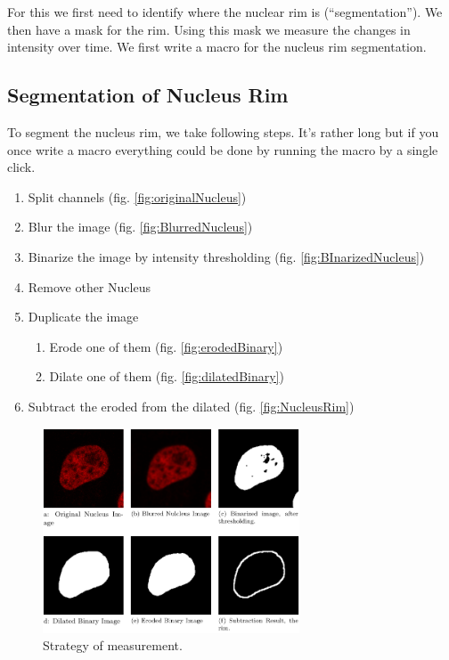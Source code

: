 \documentclass[11pt,a4paper,oneside]{report}
\begin{document}
For this we first need to identify where the nuclear rim is (``segmentation''). We then have a mask for the rim. Using this mask we measure the changes in intensity over time. We first write a macro for the nucleus rim segmentation. 

\subsection{Segmentation of Nucleus Rim}

To segment the nucleus rim, we take following steps. It's rather long but if you once write a macro everything could be done by running the macro by a single click. 

\begin{enumerate}
  \item Split channels (fig. \ref{fig:originalNucleus})
    \item Blur the image (fig. \ref{fig:BlurredNucleus})
    \item Binarize the image by intensity thresholding (fig. \ref{fig:BInarizedNucleus})
    \item Remove other Nucleus
    \item Duplicate the image
    \begin{enumerate}
        \item Erode one of them (fig. \ref{fig:erodedBinary})

        \item Dilate one of them (fig. \ref{fig:dilatedBinary})

    \end{enumerate}
    \item Subtract the eroded from the dilated (fig. \ref{fig:NucleusRim})

\end{enumerate}

\begin{figure}[h!]
\centering
\includegraphics[width=3in]{nucsegfig-nucsegProc.pdf}

 \caption{Strategy of measurement.}

 \label{fig:nucsegProc}
\end{figure}
\end{document}
